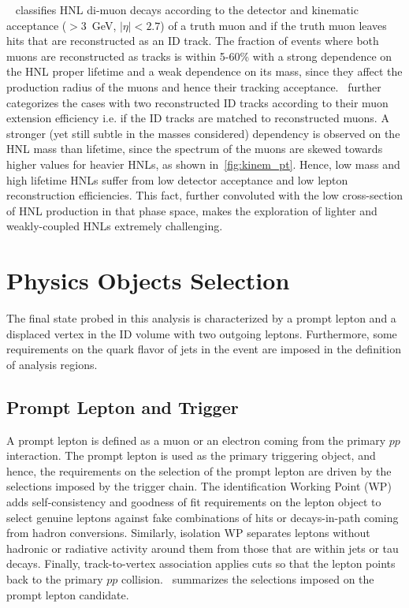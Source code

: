 ~ classifies HNL di-muon decays according to the detector and kinematic acceptance (\pT$>3$~GeV, $|\eta|<2.7$) of a truth muon and if the truth muon leaves hits that are reconstructed as an ID track. The fraction of events where both muons are reconstructed as tracks is within 5-60\% with a strong dependence on the HNL proper lifetime and a weak dependence on its mass, since they affect the production radius of the muons and hence their tracking acceptance.~ further categorizes the cases with two reconstructed ID tracks according to their muon extension efficiency i.e. if the ID tracks are matched to reconstructed muons. A stronger (yet still subtle in the masses considered) dependency is observed on the HNL mass than lifetime, since the \pT spectrum of the muons are skewed towards higher values for heavier HNLs, as shown in~\cref{fig:kinem_pt}. Hence, low mass and high lifetime HNLs suffer from low detector acceptance and low lepton reconstruction efficiencies. This fact, further convoluted with the low cross-section of HNL production in that phase space, makes the exploration of lighter and weakly-coupled HNLs extremely challenging.

\section{Physics Objects Selection}\label{sec:object_sel}
The final state probed in this analysis is characterized by a prompt lepton and a displaced vertex in the ID volume with two outgoing leptons. Furthermore, some requirements on the quark flavor of jets in the event are imposed in the definition of analysis regions.

\subsection{Prompt Lepton and Trigger}
A prompt lepton is defined as a muon or an electron coming from the primary $pp$ interaction. The prompt lepton is used as the primary triggering object, and hence, the requirements on the selection of the prompt lepton are driven by the selections imposed by the trigger chain. The identification Working Point (WP) adds self-consistency and goodness of fit requirements on the lepton object to select genuine leptons against fake combinations of hits or decays-in-path coming from hadron conversions. Similarly, isolation WP separates leptons without hadronic or radiative activity around them from those that are within jets or tau decays. Finally, track-to-vertex association applies cuts so that the lepton points back to the primary $pp$ collision.~ summarizes the selections imposed on the prompt lepton candidate.


